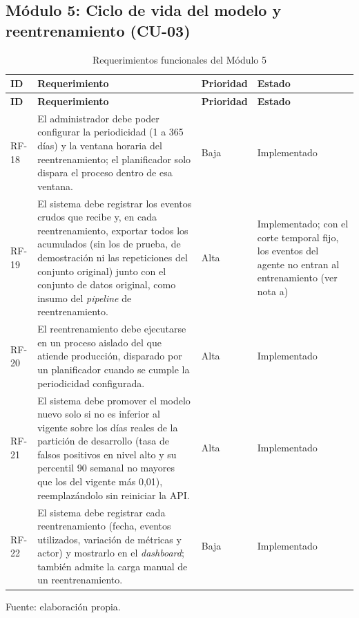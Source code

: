 \subsection{Módulo 5: Ciclo de vida del modelo y reentrenamiento (CU-03)}
\begin{tablacompacta}
\begin{longtable}{P{1.1cm}P{9.3cm}C{1.6cm}P{2.6cm}}
	\caption{Requerimientos funcionales del Módulo 5}
	\label{tab:rf-modulo5}\\
	\hline
	\textbf{ID} & \textbf{Requerimiento} & \textbf{Prioridad} & \textbf{Estado} \\
	\hline
	\endfirsthead
	\hline
	\textbf{ID} & \textbf{Requerimiento} & \textbf{Prioridad} & \textbf{Estado} \\
	\hline
	\endhead
	RF-18 & El administrador debe poder configurar la periodicidad (1 a 365 días) y la ventana horaria del reentrenamiento; el planificador solo dispara el proceso dentro de esa ventana. & Baja & Implementado \\
	\hline
	RF-19 & El sistema debe registrar los eventos crudos que recibe y, en cada reentrenamiento, exportar todos los acumulados (sin los de prueba, de demostración ni las repeticiones del conjunto original) junto con el conjunto de datos original, como insumo del \emph{pipeline} de reentrenamiento. & Alta & Implementado; con el corte temporal fijo, los eventos del agente no entran al entrenamiento (ver nota a) \\
	\hline
	RF-20 & El reentrenamiento debe ejecutarse en un proceso aislado del que atiende producción, disparado por un planificador cuando se cumple la periodicidad configurada. & Alta & Implementado \\
	\hline
	RF-21 & El sistema debe promover el modelo nuevo solo si no es inferior al vigente sobre los días reales de la partición de desarrollo (tasa de falsos positivos en nivel alto y su percentil 90 semanal no mayores que los del vigente más 0,01), reemplazándolo sin reiniciar la API. & Alta & Implementado \\
	\hline
	RF-22 & El sistema debe registrar cada reentrenamiento (fecha, eventos utilizados, variación de métricas y actor) y mostrarlo en el \emph{dashboard}; también admite la carga manual de un reentrenamiento. & Baja & Implementado \\
	\hline
\end{longtable}
{\small Fuente: elaboración propia.\par}
\end{tablacompacta}

